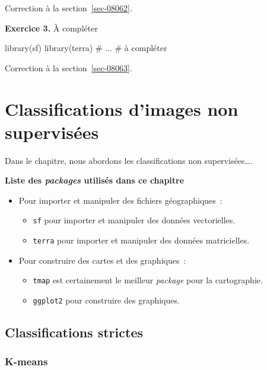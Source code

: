\documentclass[
  letterpaper,
  DIV=11,
  numbers=noendperiod]{scrreprt}
\newenvironment{Shaded}{\begin{snugshade}}{\end{snugshade}}
\newcommand{\CommentTok}[1]{\textcolor[rgb]{0.37,0.37,0.37}{#1}}
\newcommand{\NormalTok}[1]{\textcolor[rgb]{0.00,0.23,0.31}{#1}}
\providecommand{\tightlist}{%
  \setlength{\itemsep}{0pt}\setlength{\parskip}{0pt}}\usepackage{longtable,booktabs,array}
\begin{document}
Correction à la section~\ref{sec-08062}.

\textbf{Exercice 3.} À compléter

\begin{Shaded}
\begin{Highlighting}[]
\NormalTok{library(sf)}
\NormalTok{library(terra)}
\CommentTok{\# ...}
\CommentTok{\# à compléter}
\end{Highlighting}
\end{Shaded}

Correction à la section~\ref{sec-08063}.


\chapter{Classifications d'images non supervisées}\label{sec-chap06}

Dans le chapitre, nous abordons les classifications non
supervisées\ldots.

\textbf{Liste des \emph{packages} utilisés dans ce chapitre}

\begin{itemize}
\tightlist
\item
  Pour importer et manipuler des fichiers géographiques~:

  \begin{itemize}
  \tightlist
  \item
    \texttt{sf} pour importer et manipuler des données vectorielles.
  \item
    \texttt{terra} pour importer et manipuler des données matricielles.
  \end{itemize}
\item
  Pour construire des cartes et des graphiques~:

  \begin{itemize}
  \tightlist
  \item
    \texttt{tmap} est certainement le meilleur \emph{package} pour la
    cartographie.
  \item
    \texttt{ggplot2} pour construire des graphiques.
  \end{itemize}
\end{itemize}

\section{Classifications strictes}\label{sec-061}

\subsection{K-means}\label{sec-0611}
\end{document}
